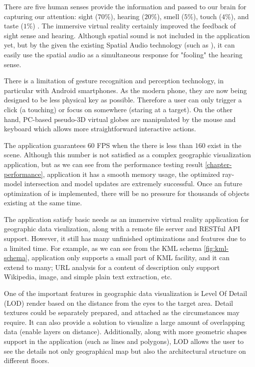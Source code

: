 There are five human senses provide the information and passed to our brain for capturing our attention: sight ($70$\%), hearing ($20$\%), smell ($5$\%), touch ($4$\%), and taste ($1$\%) \cite{mazuryk.vr.1996}. The immersive virtual reality certainly improved the feedback of sight sense and hearing. Although spatial sound is not included in the application yet, but by the given the existing Spatial Audio technology (such as \cite{google.spatial-audio.2016}), it can easily use the spatial audio as a simultaneous response for "fooling" the hearing sense.

There is a limitation of gesture recognition and perception technology, in particular with Android smartphones. As the modern phone, they are now being designed to be less physical key as possible. Therefore a user can only trigger a click (a touching) or focus on somewhere (staring at a target). On the other hand, PC-based pseudo-3D virtual globes are manipulated by the mouse and keyboard which allows more straightforward interactive actions.

The application guarantees $60$ FPS when the there is less than $160$  exist in the scene. Although this number is not satisfied as a complex geographic visualization application, but as we can see from the performance testing result \ref{chapter-performance}, application it has a smooth memory usage, the optimized ray-model intersection and model updates are extremely successful. Once an future optimization of  is implemented, there will be no pressure for thousands of objects existing at the same time.

The application satisfy basic needs as an immersive virtual reality application for geographic data visulization, along with a remote file server and RESTful API support. However, it still has many unfinished optimizations and features due to a limited time. For example, as we can see from the KML schema \ref{fig:kml-schema}, application only supports a small part of KML facility, and it can extend to many; URL analysis for a content of description only support Wikipedia, image, and simple plain text extraction, etc.

One of the important features in geographic data visualization is Level Of Detail (LOD) render based on the distance from the eyes to the target area. Detail textures could be separately prepared, and attached as the circumstances may require. It can also provide a solution to visualize a large amount of overlapping data (enable layers on distance). Additionally, along with more geometric shapes support in the application (such as lines and polygons), LOD allows the user to see the details not only geographical map but also the architectural structure on different floors.

